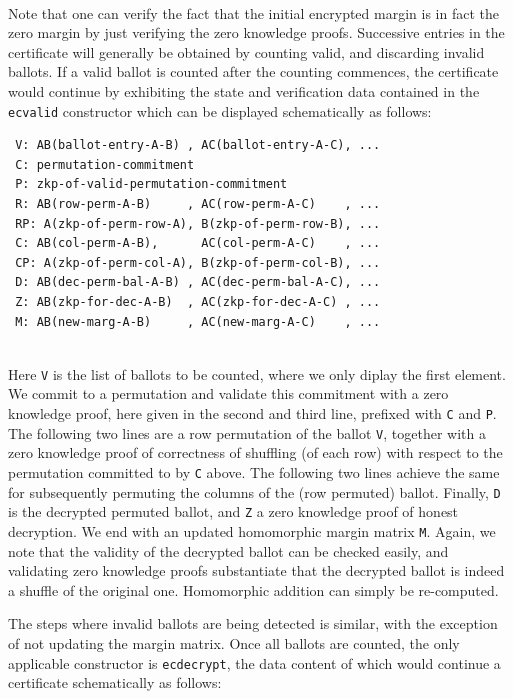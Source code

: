  \mbox{}\\[-5ex]
 Note that one can verify the fact that the initial encrypted margin
 is in fact the zero margin by just verifying the zero knowledge
 proofs. Successive entries in the certificate will generally be
 obtained by counting valid, and discarding invalid ballots. If a
 valid ballot is counted after the counting commences, the
 certificate would continue by exhibiting the state and verification
 data contained in the \texttt{ecvalid} constructor which can be
 displayed schematically as follows:

 {\small\begin{verbatim}
 V: AB(ballot-entry-A-B) , AC(ballot-entry-A-C), ...
 C: permutation-commitment
 P: zkp-of-valid-permutation-commitment
 R: AB(row-perm-A-B)     , AC(row-perm-A-C)    , ...
 RP: A(zkp-of-perm-row-A), B(zkp-of-perm-row-B), ... 
 C: AB(col-perm-A-B),      AC(col-perm-A-C)    , ...
 CP: A(zkp-of-perm-col-A), B(zkp-of-perm-col-B), ...
 D: AB(dec-perm-bal-A-B) , AC(dec-perm-bal-A-C), ...
 Z: AB(zkp-for-dec-A-B)  , AC(zkp-for-dec-A-C) , ...
 M: AB(new-marg-A-B)     , AC(new-marg-A-C)    , ...
 \end{verbatim}}

 \mbox{}\\[-5ex]
 Here \texttt{V} is the list of ballots to be counted, where we only
 diplay the first element. We
 commit to a permutation and validate this commitment with a zero
 knowledge proof, here given in the second and third line, prefixed
 with \texttt{C} and \texttt{P}. The following two lines are a row
 permutation of the ballot \texttt{V}, together with a zero
 knowledge proof of correctness of shuffling (of each row) with
 respect to the permutation committed to by \texttt{C} above. The
 following two lines achieve the same for subsequently permuting the
 columns of the (row permuted) ballot. Finally, \texttt{D} is the
 decrypted permuted ballot, and \texttt{Z} a zero knowledge proof of
 honest decryption. We end with an updated homomorphic margin
 matrix \texttt{M}. Again, we note that the validity of the
 decrypted ballot can be checked easily, and validating zero
 knowledge proofs substantiate that the decrypted ballot is indeed a
 shuffle of the original one. Homomorphic addition can simply be
 re-computed.

 The steps where invalid ballots are being detected is similar, with
 the exception of not updating the margin matrix. Once all ballots
 are counted, the only applicable constructor is \texttt{ecdecrypt},
 the data content of which would continue a certificate
 schematically as follows:

